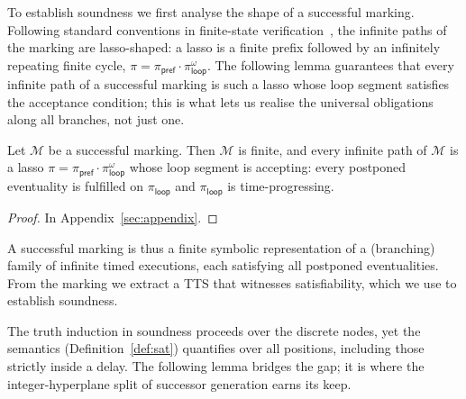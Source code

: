 To establish soundness we first analyse the shape of a successful marking. Following standard conventions in finite-state verification~\cite{Clarke99}, the infinite paths of the marking are lasso-shaped: a lasso is a finite prefix followed by an infinitely repeating finite cycle, $\pi=\pi_{\mathsf{pref}}\cdot \pi_{\mathsf{loop}}^\omega$. The following lemma guarantees that {every} infinite path of a successful marking is such a lasso whose loop segment satisfies the acceptance condition; this is what lets us realise the universal obligations along all branches, not just one.





\begin{lemma}\label{lem:lasso}
Let $\mathcal{M}$ be a successful marking. Then $\mathcal{M}$ is finite, and every infinite path of $\mathcal{M}$ is a lasso $\pi=\pi_{\mathsf{pref}}\cdot \pi_{\mathsf{loop}}^\omega$ whose loop segment is accepting: every postponed eventuality is fulfilled on $\pi_{\mathsf{loop}}$ and $\pi_{\mathsf{loop}}$ is time-progressing.
\end{lemma}

\begin{proof}
    In Appendix~\ref{sec:appendix}.
\end{proof}

A successful marking is thus a finite symbolic representation of a (branching) family of infinite timed executions, each satisfying all postponed eventualities. From the marking we extract a TTS that witnesses satisfiability, which we use to establish soundness.

The truth induction in soundness proceeds over the {discrete} nodes, yet the semantics (Definition~\ref{def:sat}) quantifies over {all} positions, including those strictly inside a delay. The following lemma bridges the gap; it is where the integer-hyperplane split of successor generation earns its keep.

